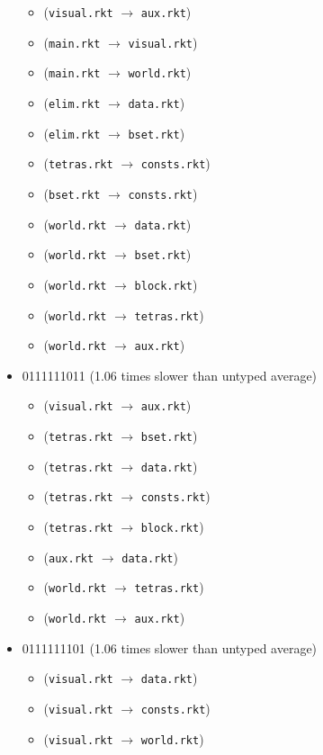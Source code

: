 \documentclass{article}
\newcommand{\mono}[1]{\texttt{#1}}
\begin{document}
\begin{itemize}
\begin{itemize}
  \item (\mono{visual.rkt} $\rightarrow$ \mono{aux.rkt})
  \item (\mono{main.rkt} $\rightarrow$ \mono{visual.rkt})
  \item (\mono{main.rkt} $\rightarrow$ \mono{world.rkt})
  \item (\mono{elim.rkt} $\rightarrow$ \mono{data.rkt})
  \item (\mono{elim.rkt} $\rightarrow$ \mono{bset.rkt})
  \item (\mono{tetras.rkt} $\rightarrow$ \mono{consts.rkt})
  \item (\mono{bset.rkt} $\rightarrow$ \mono{consts.rkt})
  \item (\mono{world.rkt} $\rightarrow$ \mono{data.rkt})
  \item (\mono{world.rkt} $\rightarrow$ \mono{bset.rkt})
  \item (\mono{world.rkt} $\rightarrow$ \mono{block.rkt})
  \item (\mono{world.rkt} $\rightarrow$ \mono{tetras.rkt})
  \item (\mono{world.rkt} $\rightarrow$ \mono{aux.rkt})
  \end{itemize}
\item 0111111011 (1.06 times slower than untyped average)
  \begin{itemize}
  \item (\mono{visual.rkt} $\rightarrow$ \mono{aux.rkt})
  \item (\mono{tetras.rkt} $\rightarrow$ \mono{bset.rkt})
  \item (\mono{tetras.rkt} $\rightarrow$ \mono{data.rkt})
  \item (\mono{tetras.rkt} $\rightarrow$ \mono{consts.rkt})
  \item (\mono{tetras.rkt} $\rightarrow$ \mono{block.rkt})
  \item (\mono{aux.rkt} $\rightarrow$ \mono{data.rkt})
  \item (\mono{world.rkt} $\rightarrow$ \mono{tetras.rkt})
  \item (\mono{world.rkt} $\rightarrow$ \mono{aux.rkt})
  \end{itemize}
\item 0111111101 (1.06 times slower than untyped average)
  \begin{itemize}
  \item (\mono{visual.rkt} $\rightarrow$ \mono{data.rkt})
  \item (\mono{visual.rkt} $\rightarrow$ \mono{consts.rkt})
  \item (\mono{visual.rkt} $\rightarrow$ \mono{world.rkt})

\end{itemize}
\end{itemize}
\end{document}
